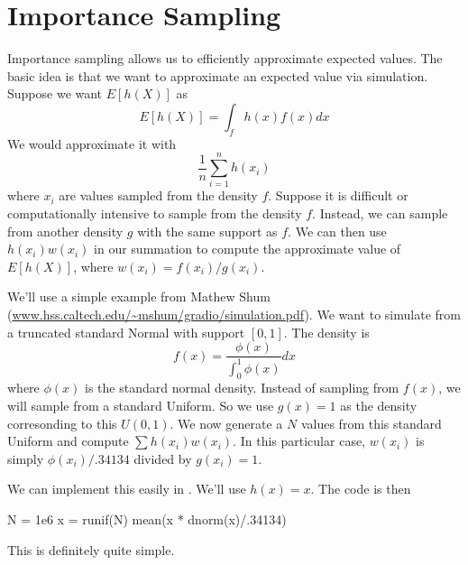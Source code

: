 \section{Importance Sampling} 

Importance sampling allows us to efficiently approximate expected
values.  The basic idea is that we want to approximate an expected
value via simulation. 
Suppose we want $E[h(X)]$ as 
$$
 E[h(X)] = \int_f h(x) f(x) dx
$$
We would approximate it with
$$
  \frac{1}{n} \sum_{i=1}^n h(x_i)
$$
where $x_i$ are values sampled from the density $f$.
Suppose it is difficult or computationally intensive to sample from
the density $f$.
Instead, we can sample from another  density $g$ with
the same support as $f$.
We can then use $h(x_i) w(x_i)$ in our summation
to compute the approximate value of $E[h(X)]$,
where $w(x_i) = f(x_i)/g(x_i)$.


We'll use a simple example from Mathew Shum
(\url{www.hss.caltech.edu/~mshum/gradio/simulation.pdf}).
We want to simulate from a truncated standard Normal with support
$[0,1]$.
The density is 
$$f(x) = \frac{\phi(x)}{\int_{0}^{1} \phi(x)} dx$$ 
where $\phi(x)$ is the
standard normal density.  Instead of sampling from $f(x)$, we will
sample from a standard Uniform. So we use $g(x) = 1$ as the density
corresonding to this $U(0, 1)$.  We now generate a $N$ values from
this standard Uniform and compute $\sum h(x_i) w(x_i)$.  In this
particular case, $w(x_i)$ is simply $\phi(x_i)/.34134$ divided by
$g(x_i) = 1$.

We can implement this easily in \R{}.
We'll use $h(x) = x$.
The code is then
\begin{RCode}
N = 1e6
x = runif(N)
mean(x * dnorm(x)/.34134)
\end{RCode}
This is definitely quite simple. 

